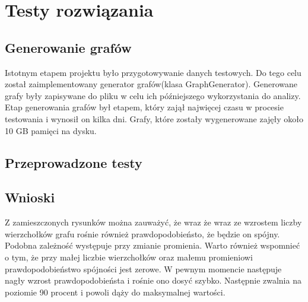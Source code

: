 \section{Testy rozwiązania}
	\label{final:testy}

	\subsection{Generowanie grafów}
		\label{final:testy:generowanie}

		Istotnym etapem projektu było przygotowywanie danych testowych. Do tego celu został zaimplementowany generator grafów(klasa GraphGenerator). Generowane grafy były zapisywane do pliku w celu ich późniejszego wykorzystania do analizy. Etap generowania grafów był etapem, który zajął najwięcej czasu w procesie testowania i wynosił on kilka dni. Grafy, które zostały wygenerowane zajęły około 10 GB pamięci na dysku.
	\subsection{Przeprowadzone testy}
		\label{final:testy:przyklad1}
		
		
		
		
		
		
		
		
		
		
		
		

	\subsection{Wnioski}
		\label{final:testy:wnioski}
	
	Z zamieszczonych rysunków można zauważyć, że wraz że wraz ze wzrostem liczby wierzchołków grafu rośnie również prawdopodobieństo, że będzie on spójny. Podobna zależność występuje przy zmianie promienia. Warto również wspomnieć o tym, że przy małej liczbie wierzchołków oraz małemu promieniowi prawdopodobieństwo spójności jest zerowe. W pewnym momencie następuje nagły wzrost prawdopodobieństa i rośnie ono dosyć szybko. Następnie zwalnia na poziomie 90 procent i powoli dąży do maksymalnej wartości.

